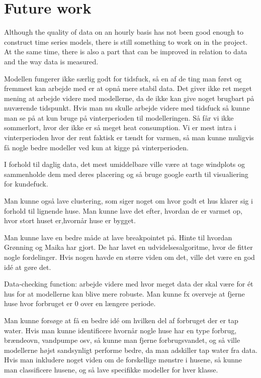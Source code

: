 \section{Future work}
Although the quality of data on an hourly basis has not been good enough to construct time series models, there is still something to work on in the project. At the same time, there is also a part that can be improved in relation to data and the way data is measured. \\

\noindent 

Modellen fungerer ikke særlig godt for tidsfuck, så en af de ting man først og fremmest kan arbejde med er at opnå mere stabil data. Det giver ikke ret meget mening at arbejde videre med modellerne, da de ikke kan give noget brugbart på nuværende tidspunkt. Hvis man nu skulle arbejde videre med tidsfuck så kunne man se på at kun bruge på vinterperioden til modelleringen. Så får vi ikke sommerlort, hvor der ikke er så meget heat consumption. Vi er mest intra i vinterperioden hvor der rent faktisk er tændt for varmen, så man kunne muligvis få nogle bedre modeller ved kun at kigge på vinterperioden.

I forhold til daglig data, det mest umiddelbare ville være at tage windplots og sammenholde dem med deres placering og så bruge google earth til visualiering for kundefuck. 

Man kunne også lave clustering, som siger noget om hvor godt et hus klarer sig i forhold til lignende huse. Man kunne lave det efter, hvordan de er varmet op, hvor stort huset er,hvornår huse er bygget. 

Man kunne lave en bedre måde at lave breakpointet på. Hinte til hvordan Grønning og Maika har gjort. De har lavet en udvidelsesalgoritme, hvor de fitter nogle fordelinger. Hvis nogen havde en større viden om det, ville det være en god idé at gøre det.

Data-checking function: arbejde videre med hvor meget data der skal være for ét hus for at modellerne kan blive mere robuste. Man kunne fx overveje at fjerne huse hvor forbruget er 0 over en længere periode. 

Man kunne forsøge at få en bedre idé om hvilken del af forbruget der er tap water. Hvis man kunne identificere hvornår nogle huse har en type forbrug, brændeovn, vandpumpe osv, så kunne man fjerne forbrugsvandet, og så ville modellerne højst sandsynligt performe bedre, da man adskiller tap water fra data. Hvis man inkludere noget viden om de forskellige mønstre i husene, så kunne man classificere husene, og så lave specifikke modeller for hver klasse. 